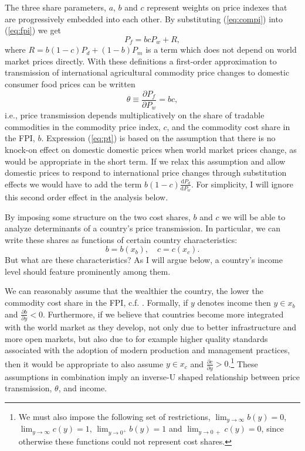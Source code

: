 \documentclass[12pt,english]{article}
\begin{document}
The three share parameters, $a$, $b$ and $c$ represent weights on price indexes that are progressively embedded into each other. By substituting (\ref{eq:compi}) into (\ref{eq:fpi}) we get
\begin{equation}
P_{f} = b c P_{w}+R\label{eq:fpi1},
\end{equation}
where $R=b(1-c)P_{d}+(1-b)P_{m}$ is a term which does not depend on world market prices directly. With these definitions a first-order approximation to transmission of international agricultural commodity price changes to domestic consumer food prices can be written
\begin{equation}
\theta\equiv\frac{\partial P_{f}}{\partial P_{w}}=bc,\label{eq:pt}
\end{equation}
i.e., price transmission depends multiplicatively on the share of tradable commodities in the commodity price index, $c$, and the commodity cost share in the FPI, $b$. Expression (\ref{eq:pt}) is based on the assumption that there is no knock-on effect on domestic domestic prices when world market prices change, as would be appropriate in the short term. If we relax this assumption and allow domestic prices to respond to international price changes through substitution effects we would have to add the term $b(1-c)\frac{\mathrm{d}P_{d}}{\mathrm{d}P_{w}}$. For simplicity, I will ignore this second order effect in the analysis below.

By imposing some structure on the two cost shares, $b$ and $c$ we will be able to analyze determinants of a country's price transmission. In particular, we can write these shares as functions of certain country characteristics:
\begin{equation}
b=b(x_{b}), \quad c=c(x_{c}).
\end{equation}
But what are these characteristics? As I will argue below, a country's income level should feature prominently among them.

We can reasonably assume that the wealthier the country, the lower the commodity cost share in the FPI, c.f. \citet{Abbott2009}. Formally, if $y$ denotes income then $y\in x_{b}$ and $\frac{\partial b}{\partial y} <0$. Furthermore, if we believe that countries become more integrated with the world market as they develop, not only due to better infrastructure and more open markets, but also due to for example higher quality standards associated with the adoption of modern production and management practices, then it would be appropriate to also assume $y\in x_{c}$ and $\frac{\partial c}{\partial y} >0$.\footnote{We must also impose the following set of restrictions, $\lim_{y\rightarrow \infty} b(y)=0$, $\lim_{y\rightarrow \infty} c(y)=1$, $\lim_{y\rightarrow 0^{+}} b(y)=1$ and $\lim_{y\rightarrow 0~{+}} c(y)=0$, since otherwise these functions could not represent cost shares.} These assumptions in combination imply an inverse-U shaped relationship between price transmission, $\theta$, and income.
\end{document}
